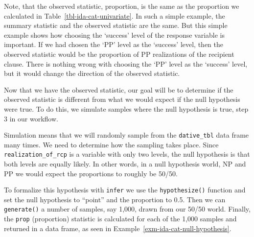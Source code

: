 \documentclass[
  letterpaper,
]{latex/krantz}
\theoremstyle{definition}
\theoremstyle{remark}
\begin{document}
Note, that the observed statistic, proportion, is the same as the
proportion we calculated in Table~\ref{tbl-ida-cat-univariate}. In such
a simple example, the summary statistic and the observed statistic are
the same. But this simple example shows how choosing the `success' level
of the response variable is important. If we had chosen the `PP' level
as the `success' level, then the observed statistic would be the
proportion of PP realizations of the recipient clause. There is nothing
wrong with choosing the `PP' level as the `success' level, but it would
change the direction of the observed statistic.

Now that we have the observed statistic, our goal will be to determine
if the observed statistic is different from what we would expect if the
null hypothesis were true. To do this, we simulate samples where the
null hypothesis is true, step 3 in our workflow.

Simulation means that we will randomly sample from the
\texttt{dative\_tbl} data frame many times. We need to determine how the
sampling takes place. Since \texttt{realization\_of\_rcp} is a variable
with only two levels, the null hypothesis is that both levels are
equally likely. In other words, in a null hypothesis world, NP and PP we
would expect the proportions to roughly be 50/50.

To formalize this hypothesis with \texttt{infer} we use the
\texttt{hypothesize()} function and set the null hypothesis to ``point''
and the proportion to 0.5. Then we can \texttt{generate()} a number of
samples, say 1,000, drawn from our 50/50 world. Finally, the
\texttt{prop} (proportion) statistic is calculated for each of the 1,000
samples and returned in a data frame, as seen in
Example~\ref{exm-ida-cat-null-hypothesis}.
\end{document}
